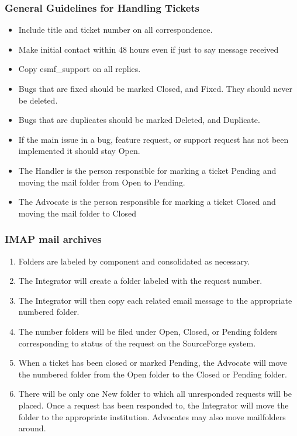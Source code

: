 \subsubsection{General Guidelines for Handling Tickets}
\begin{itemize}
\item Include title and ticket number on all correspondence.
\item Make initial contact within 48 hours even if just to say message received
\item Copy esmf\_support on all replies.
\item Bugs that are fixed should be marked Closed, and Fixed. They should never be deleted. 
\item Bugs that are duplicates should be marked Deleted, and Duplicate. 
\item If the main issue in a bug, feature request, or support request has not been implemented it should stay Open.
\item The Handler is the person responsible for marking a ticket Pending and moving the mail folder from Open to Pending.
\item The Advocate is the person responsible for marking a ticket Closed and moving the mail folder to Closed
\end{itemize}

\subsubsection{IMAP mail archives}
\begin{enumerate}
\item Folders are labeled by component and consolidated as necessary.
\item The Integrator will create a folder labeled with the request number. 
\item The Integrator will then copy each related email message to the appropriate 
numbered folder. 
\item The number folders will be filed under Open, Closed, or Pending folders 
corresponding to status of the request on the SourceForge system.
\item When a ticket has been closed or marked Pending, the Advocate will move the numbered folder from the Open folder to the Closed or Pending folder.
\item There will be only one New folder to which all unresponded requests will be placed. Once a request has been responded to, the Integrator will move the folder to the appropriate institution. Advocates may also move mailfolders around.
\end{enumerate}

